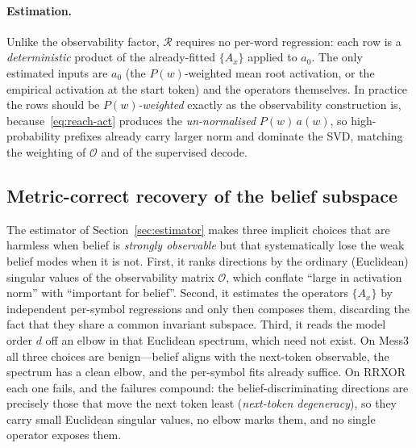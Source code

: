 \documentclass[11pt]{article}
\begin{document}
\paragraph{Estimation.}
Unlike the observability factor, $\mathcal{R}$ requires no per-word regression: each row is a
\emph{deterministic} product of the already-fitted $\{A_x\}$ applied to $a_0$. The only estimated
inputs are $a_0$ (the $P(w)$-weighted mean root activation, or the empirical activation at the
start token) and the operators themselves. In practice the rows should be \emph{$P(w)$-weighted}
exactly as the observability construction is, because~\eqref{eq:reach-act} produces the
\emph{un-normalised} $P(w)\,a(w)$, so high-probability prefixes already carry larger norm and
dominate the SVD, matching the weighting of $\mathcal{O}$ and of the supervised decode.


\subsection{Metric-correct recovery of the belief subspace}
\label{sec:refined-estimator}

The estimator of Section~\ref{sec:estimator} makes three implicit choices that are
harmless when belief is \emph{strongly observable} but that systematically lose the weak
belief modes when it is not. First, it ranks directions by the ordinary (Euclidean)
singular values of the observability matrix $\mathcal{O}$, which conflate ``large in
activation norm'' with ``important for belief''. Second, it estimates the operators
$\{A_x\}$ by independent per-symbol regressions and only then composes them, discarding the
fact that they share a common invariant subspace. Third, it reads the model order $d$ off an
elbow in that Euclidean spectrum, which need not exist. On Mess3 all three choices are
benign---belief aligns with the next-token observable, the spectrum has a clean elbow, and
the per-symbol fits already suffice. On RRXOR each one fails, and the failures compound: the
belief-discriminating directions are precisely those that move the next token least
(\emph{next-token degeneracy}), so they carry small Euclidean singular values, no elbow
marks them, and no single operator exposes them.
\end{document}
